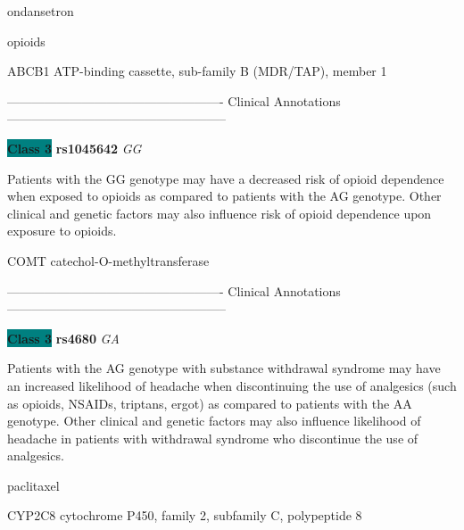 \documentclass{resume} %
\begin{document}
\begin{rSection}{ ondansetron }
\end{rSection}\begin{rSection}{ opioids }
\item[]

\begin{rSubsection}{ ABCB1 }{ ATP-binding cassette, sub-family B (MDR/TAP), member 1 }{}{}
\item[]

\item[] ---------------------------------------------------- Clinical Annotations -----------------------------------------------------\newline
\item \textbf{\colorbox{teal} {Class 3}} \textbf{ rs1045642 } \textit{ GG }
\item[] Patients with the GG genotype may have a decreased risk of opioid dependence when exposed to opioids as compared to patients with the AG genotype. Other clinical and genetic factors may also influence risk of opioid dependence upon exposure to opioids. 
\end{rSubsection}\begin{rSubsection}{ COMT }{ catechol-O-methyltransferase }{}{}
\item[]

\item[] ---------------------------------------------------- Clinical Annotations -----------------------------------------------------\newline
\item \textbf{\colorbox{teal} {Class 3}} \textbf{ rs4680 } \textit{ GA }
\item[] Patients with the AG genotype with substance withdrawal syndrome may have an increased likelihood of headache when discontinuing the use of analgesics (such as opioids, NSAIDs, triptans, ergot) as compared to patients with the AA genotype. Other clinical and genetic factors may also influence likelihood of headache in patients with withdrawal syndrome who discontinue the use of analgesics.
\end{rSubsection}

\end{rSection}\begin{rSection}{ paclitaxel }
\item[]

\begin{rSubsection}{ CYP2C8 }{ cytochrome P450, family 2, subfamily C, polypeptide 8 }{}{}
\item[]


\end{rSubsection}
\end{rSection}
\end{document}
